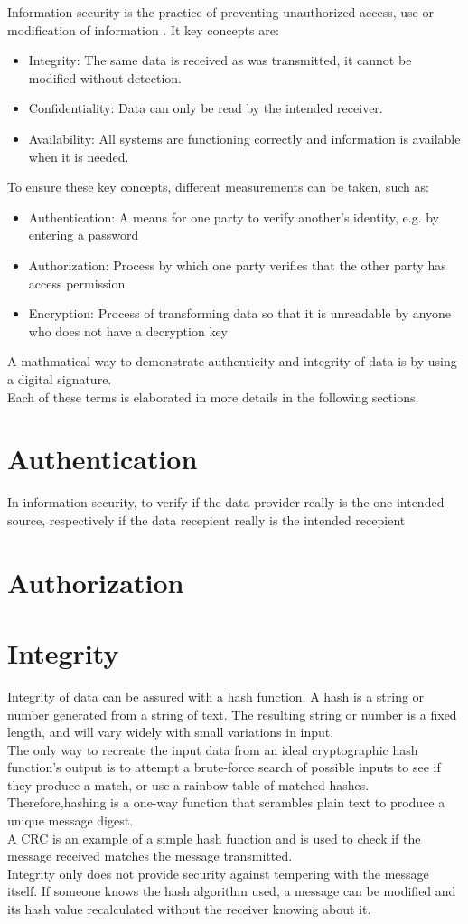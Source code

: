 %
Information security is the practice of preventing unauthorized access, use or modification of information \cite{Security_BuEdu}. It key concepts are:
\begin{itemize}
    \item Integrity: The same data is received as was transmitted, it cannot be modified without detection.
    \item Confidentiality: Data can only be read by the intended receiver.
    \item Availability: All systems are functioning correctly and information is available when it is needed.
\end{itemize}
To ensure these key concepts, different measurements can be taken, such as:
\begin{itemize}
    \item Authentication: A means for one party to verify another's identity, e.g. by entering a password
    \item Authorization: Process by which one party verifies that the other party has access permission
    \item Encryption: Process of transforming data so that it is unreadable by anyone who does not have a decryption key
\end{itemize}
A mathmatical way to demonstrate authenticity and integrity of data is by using a digital signature.\\
Each of these terms is elaborated in more details in the following sections.
%
%
%
\section{Authentication}
In information security, to verify if the data provider really is the one intended source, respectively if the data recepient really is the intended recepient
%
%
%
\section{Authorization}
%
%
%
%
\section{Integrity}
Integrity of data can be assured with a hash function. A hash is a string or number generated from a string of text. The resulting string or number is a fixed length, and will vary widely with small variations in input.\\
The only way to recreate the input data from an ideal cryptographic hash function's output is to attempt a brute-force search of possible inputs to see if they produce a match, or use a rainbow table of matched hashes. Therefore,hashing is a one-way function that scrambles plain text to produce a unique message digest. \\
A CRC is an example of a simple hash function and is used to check if the message received matches the message transmitted.\\
Integrity only does not provide security against tempering with the message itself. If someone knows the hash algorithm used, a message can be modified and its hash value recalculated without the receiver knowing about it.
%
